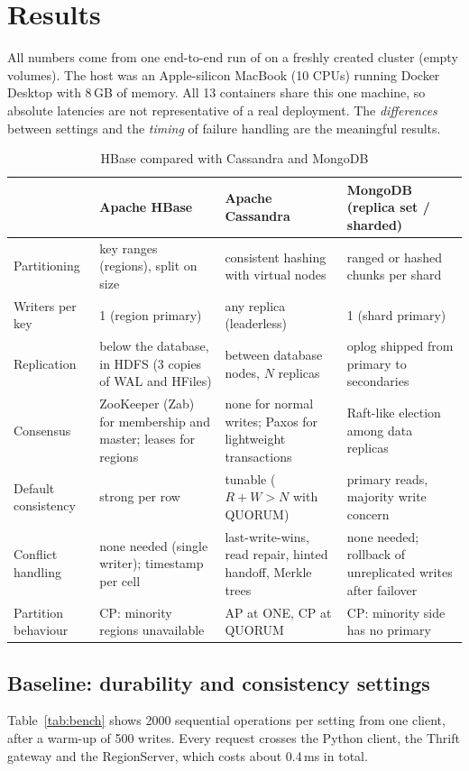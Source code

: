 \section{Results}\label{sec:results}
All numbers come from one end-to-end run of  on a freshly created cluster (empty volumes). The host was an Apple-silicon MacBook (10 CPUs) running Docker Desktop with 8\,GB of memory. All 13 containers share this one machine, so absolute latencies are not representative of a real deployment. The \emph{differences} between settings and the \emph{timing} of failure handling are the meaningful results.

\begin{table}[t]
\caption{HBase compared with Cassandra and MongoDB}\label{tab:compare}
\small
\begin{tabularx}{\textwidth}{@{}lXXX@{}}
\toprule
 & Apache HBase & Apache Cassandra & MongoDB (replica set / sharded) \\
\midrule
Partitioning & key ranges (regions), split on size & consistent hashing with virtual nodes & ranged or hashed chunks per shard \\
Writers per key & 1 (region primary) & any replica (leaderless) & 1 (shard primary) \\
Replication & below the database, in HDFS (3 copies of WAL and HFiles) & between database nodes, $N$ replicas & oplog shipped from primary to secondaries \\
Consensus & ZooKeeper (Zab) for membership and master; leases for regions & none for normal writes; Paxos for lightweight transactions & Raft-like election among data replicas \\
Default consistency & strong per row & tunable ($R{+}W{>}N$ with QUORUM) & primary reads, majority write concern \\
Conflict handling & none needed (single writer); timestamp per cell & last-write-wins, read repair, hinted handoff, Merkle trees & none needed; rollback of unreplicated writes after failover \\
Partition behaviour & CP: minority regions unavailable & AP at ONE, CP at QUORUM & CP: minority side has no primary \\
\bottomrule
\end{tabularx}
\end{table}

\subsection{Baseline: durability and consistency settings}
Table~\ref{tab:bench} shows 2000 sequential operations per setting from one client, after a warm-up of 500 writes. Every request crosses the Python client, the Thrift gateway and the RegionServer, which costs about 0.4\,ms in total.

